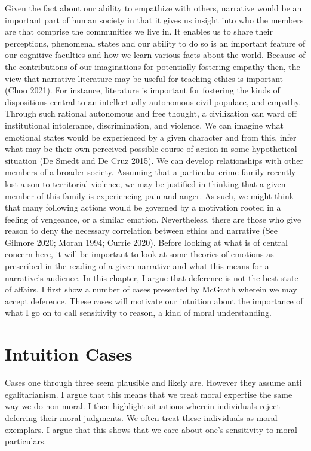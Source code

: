 \documentclass[12pt]{book}
\theoremstyle{definition}
\theoremstyle{remark}
\begin{document}
Given the fact about our ability to empathize with others, narrative would be an important part of human society in that it gives us insight into who the members are that comprise the communities we live in. It enables us to share their perceptions, phenomenal states and our ability to do so is an important feature of our cognitive faculties and how we learn various facts about the world. Because of the contributions of our imaginations for potentially fostering empathy then, the view that narrative literature may be useful for teaching ethics is important (Choo 2021). For instance, literature is important for fostering the kinds of dispositions central to an intellectually autonomous civil populace, and empathy. Through such rational autonomous and free thought, a civilization can ward off institutional intolerance, discrimination, and violence. We can imagine what emotional states would be experienced by a given character and from this, infer what may be their own perceived possible course of action in some hypothetical situation (De Smedt and De Cruz 2015). We can develop relationships with other members of a broader society. Assuming that a particular crime family recently lost a son to territorial violence, we may be justified in thinking that a given member of this family is experiencing pain and anger. As such, we might think that many following actions would be governed by a motivation rooted in a feeling of vengeance, or a similar emotion. Nevertheless, there are those who give reason to deny the necessary correlation between ethics and narrative (See Gilmore 2020; Moran 1994; Currie 2020). Before looking at what is of central concern here, it will be important to look at some theories of emotions as prescribed in the reading of a given narrative and what this means for a narrative's audience. In this chapter, I argue that deference is not the best state of affairs. I first show a number of cases presented by McGrath wherein we may accept deference. These cases will motivate our intuition about the importance of what I go on to call sensitivity to reason, a kind of moral understanding.

\section{Intuition Cases}\label{intuition-cases}

Cases one through three seem plausible and likely are. However they assume anti egalitarianism. I argue that this means that we treat moral expertise the same way we do non-moral. I then highlight situations wherein individuals reject deferring their moral judgments. We often treat these individuals as moral exemplars. I argue that this shows that we care about one's sensitivity to moral particulars.
\end{document}
